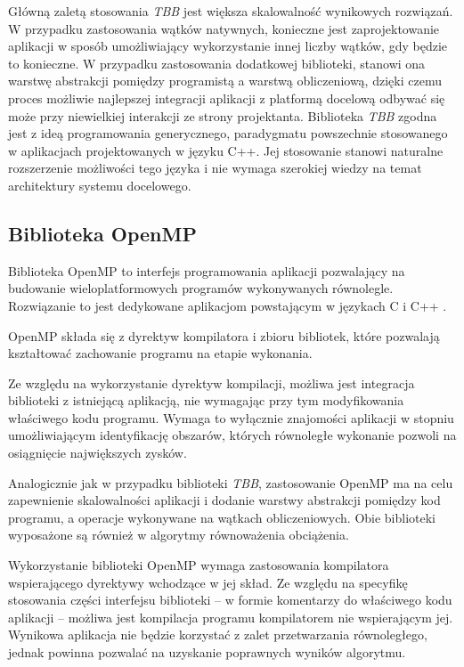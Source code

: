 Główną zaletą stosowania \emph{TBB} jest większa skalowalność wynikowych rozwiązań. 
W przypadku zastosowania wątków natywnych, konieczne jest zaprojektowanie aplikacji w sposób umożliwiający wykorzystanie innej liczby wątków, gdy będzie to konieczne. 
W przypadku zastosowania dodatkowej biblioteki, stanowi ona warstwę abstrakcji pomiędzy programistą a warstwą obliczeniową, dzięki czemu proces możliwie najlepszej integracji aplikacji z platformą docelową odbywać się może przy niewielkiej interakcji ze strony projektanta.
Biblioteka \emph{TBB} zgodna jest z ideą programowania generycznego, paradygmatu powszechnie stosowanego w aplikacjach projektowanych w języku C++.
Jej stosowanie stanowi naturalne rozszerzenie możliwości tego języka i nie wymaga szerokiej wiedzy na temat architektury systemu docelowego.

\subsection{Biblioteka OpenMP}

Biblioteka OpenMP to interfejs programowania aplikacji pozwalający na budowanie wieloplatformowych programów wykonywanych równolegle. 
Rozwiązanie to jest dedykowane aplikacjom powstającym w językach C i C++ \cite{openmp-guide}.

OpenMP składa się z dyrektyw kompilatora i zbioru bibliotek, które pozwalają kształtować zachowanie programu na etapie wykonania. %

Ze względu na wykorzystanie dyrektyw kompilacji, możliwa jest integracja biblioteki z istniejącą aplikacją, nie wymagając przy tym modyfikowania właściwego kodu programu. 
Wymaga to wyłącznie znajomości aplikacji w stopniu umożliwiającym identyfikację obszarów, których równoległe wykonanie pozwoli na osiągnięcie największych zysków. %

Analogicznie jak w przypadku biblioteki \emph{TBB}, zastosowanie OpenMP ma na celu zapewnienie skalowalności aplikacji i dodanie warstwy abstrakcji pomiędzy kod programu, a operacje wykonywane na wątkach obliczeniowych. 
Obie biblioteki wyposażone są również w algorytmy równoważenia obciążenia.

Wykorzystanie biblioteki OpenMP wymaga zastosowania kompilatora wspierającego dyrektywy wchodzące w jej skład. 
Ze względu na specyfikę stosowania części interfejsu biblioteki -- w formie komentarzy do właściwego kodu aplikacji -- możliwa jest kompilacja programu kompilatorem nie wspierającym jej. 
Wynikowa aplikacja nie będzie korzystać z zalet przetwarzania równoległego, jednak powinna pozwalać na uzyskanie poprawnych wyników algorytmu.

